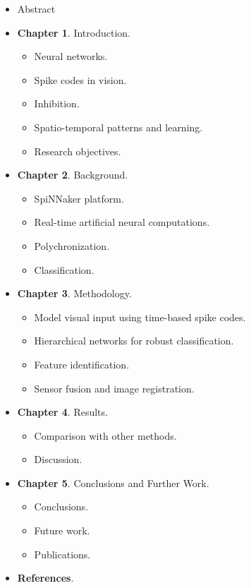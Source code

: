   \begin{itemize}
      \item Abstract
      \item \textbf{Chapter 1}. Introduction.
      \begin{itemize}
        \item Neural networks.
        \item Spike codes in vision.
        \item Inhibition.
        \item Spatio-temporal patterns and learning.
        \item Research objectives.
      \end{itemize}
      \item \textbf{Chapter 2}. Background.
      \begin{itemize}
        \item SpiNNaker platform.
        \item Real-time artificial neural computations.
        \item Polychronization.
        \item Classification.
      \end{itemize}
      \item \textbf{Chapter 3}. Methodology.
      \begin{itemize}
      \item Model visual input using time-based spike codes.
      \item Hierarchical networks for robust classification.
      \item Feature identification.
      \item Sensor fusion and image registration.
      \end{itemize}
      \item \textbf{Chapter 4}. Results.
      \begin{itemize}
        \item Comparison with other methods.
        \item Discussion.
      \end{itemize}
      \item \textbf{Chapter 5}. Conclusions and Further Work.
      \begin{itemize}
        \item Conclusions.
        \item Future work.
        \item Publications.
      \end{itemize}
      \item \textbf{References}.
      
  \end{itemize}
